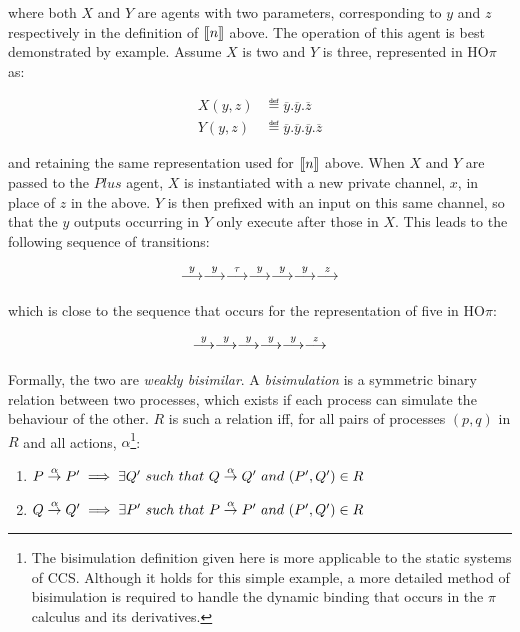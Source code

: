 \noindent where both $X$ and $Y$ are agents with two parameters,
corresponding to $y$ and $z$ respectively in the definition of $[\hspace{-0.3ex}[
n ]\hspace{-0.3ex}]$ above.  The operation of this agent is best demonstrated by
example.  Assume $X$ is two and $Y$ is three, represented in HO$\pi$ as:

\begin{align}
X(y,z) & \eqdef \overline{y}.\overline{y}.\overline{z} \\
Y(y,z) & \eqdef \overline{y}.\overline{y}.\overline{y}.\overline{z}
\end{align}

\noindent and retaining the same representation used for $[\hspace{-0.3ex}[ n
]\hspace{-0.3ex}]$ above.  When $X$ and $Y$ are passed to the $Plus$ agent, $X$ is
instantiated with a new private channel, $x$, in place of $z$ in the
above.  $Y$ is then prefixed with an input on this same channel, so
that the $y$ outputs occurring in $Y$ only execute after those in $X$.
This leads to the following sequence of transitions:

\begin{equation}
  \stackrel{y}{\longrightarrow} \stackrel{y}{\longrightarrow} \stackrel{\tau}{\longrightarrow} \stackrel{y}{\longrightarrow} \stackrel{y}{\longrightarrow} \stackrel{y}{\longrightarrow} \stackrel{z}{\longrightarrow}
\end{equation}

\noindent which is close to the sequence that occurs for the
representation of five in HO$\pi$:

\begin{equation}
  \stackrel{y}{\longrightarrow} \stackrel{y}{\longrightarrow} \stackrel{y}{\longrightarrow} \stackrel{y}{\longrightarrow} \stackrel{y}{\longrightarrow} \stackrel{z}{\longrightarrow}
\end{equation}

Formally, the two are \emph{weakly bisimilar}.  A \emph{bisimulation} is
a symmetric binary relation between two processes, which exists if each
process can simulate the behaviour of the other.  $R$ is such a relation
iff, for all pairs of processes $(p,q)$ in $R$ and all actions,
$\alpha$\footnote{The bisimulation definition given here is more
applicable to the static systems of CCS.  Although it holds for this
simple example, a more detailed method of bisimulation is required to
handle the dynamic binding that occurs in the $\pi$ calculus and its
derivatives.}:

\begin{enumerate}
\item $P \stackrel{\alpha}{\rightarrow} P^\prime \implies \exists Q^\prime\ such\
  that\ Q \stackrel{\alpha}{\rightarrow} Q^\prime\ and\ (P^\prime,Q^\prime) \in R$
\item $Q \stackrel{\alpha}{\rightarrow} Q^\prime \implies \exists P^\prime\ such\
  that\ P \stackrel{\alpha}{\rightarrow} P^\prime\ and\ (P^\prime,Q^\prime) \in R$
\end{enumerate}

